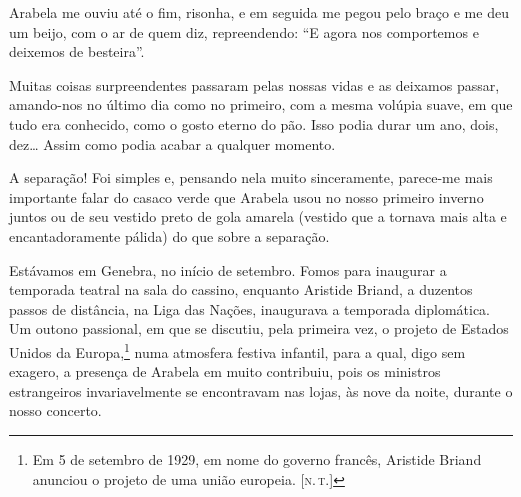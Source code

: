 
Arabela me ouviu até o fim, risonha, e em seguida me pegou pelo braço e
me deu um beijo, com o ar de quem diz, repreendendo: ``E agora nos
comportemos e deixemos de besteira''.



Muitas coisas surpreendentes passaram pelas nossas vidas e as deixamos
passar, amando-nos no último dia como no primeiro, com a mesma volúpia
suave, em que tudo era conhecido, como o gosto eterno do pão. Isso podia
durar um ano, dois, dez\ldots{} Assim como podia acabar a qualquer
momento.

A separação! Foi simples e, pensando nela muito sinceramente, parece-me
mais importante falar do casaco verde que Arabela usou no nosso primeiro
inverno juntos ou de seu vestido preto de gola amarela (vestido que a
tornava mais alta e encantadoramente pálida) do que sobre a separação.

Estávamos em Genebra, no início de setembro. Fomos para inaugurar a
temporada teatral na sala do cassino, enquanto Aristide Briand, a
duzentos passos de distância, na Liga das Nações, inaugurava a temporada
diplomática. Um outono passional, em que se discutiu, pela primeira vez,
o projeto de Estados Unidos da Europa,\footnote{Em 5 de setembro de 1929,
  em nome do governo francês, Aristide Briand anunciou o projeto de uma
  união europeia. {[}\textsc{n.\,t.}{]}} numa atmosfera festiva
infantil, para a qual, digo sem exagero, a presença de Arabela em muito
contribuiu, pois os ministros estrangeiros invariavelmente se
encontravam nas lojas, às nove da noite, durante o nosso concerto.

